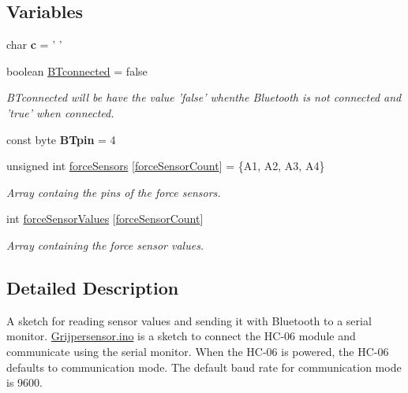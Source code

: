 \subsection*{Variables}
\begin{DoxyCompactItemize}
\item 
\hypertarget{_grijpersensor_8ino_adc08ed1554f35803d229aeaf11216b3f}{char {\bfseries c} = ' '}\label{_grijpersensor_8ino_adc08ed1554f35803d229aeaf11216b3f}

\item 
\hypertarget{_grijpersensor_8ino_aaa90a429df8bee3b9a5abc2d461504c7}{boolean \hyperlink{_grijpersensor_8ino_aaa90a429df8bee3b9a5abc2d461504c7}{B\-Tconnected} = false}\label{_grijpersensor_8ino_aaa90a429df8bee3b9a5abc2d461504c7}

\begin{DoxyCompactList}\small\item\em B\-Tconnected will be have the value 'false' whenthe Bluetooth is not connected and 'true' when connected. \end{DoxyCompactList}\item 
\hypertarget{_grijpersensor_8ino_a5b25b10ec39285cd67d590282c885137}{const byte {\bfseries B\-Tpin} = 4}\label{_grijpersensor_8ino_a5b25b10ec39285cd67d590282c885137}

\item 
unsigned int \hyperlink{_grijpersensor_8ino_a6099e7bd1f83195ab2a72d7f11b27747}{force\-Sensors} \mbox{[}\hyperlink{_grijpersensor_8ino_af1d722b858b750ddb4d06b4e2eae635b}{force\-Sensor\-Count}\mbox{]} = \{A1, A2, A3, A4\}
\begin{DoxyCompactList}\small\item\em Array containg the pins of the force sensors. \end{DoxyCompactList}\item 
int \hyperlink{_grijpersensor_8ino_add646649e927be589ada2150d1c32051}{force\-Sensor\-Values} \mbox{[}\hyperlink{_grijpersensor_8ino_af1d722b858b750ddb4d06b4e2eae635b}{force\-Sensor\-Count}\mbox{]}
\begin{DoxyCompactList}\small\item\em Array containing the force sensor values. \end{DoxyCompactList}\end{DoxyCompactItemize}


\subsection{Detailed Description}
A sketch for reading sensor values and sending it with Bluetooth to a serial monitor. \hyperlink{_grijpersensor_8ino}{Grijpersensor.\-ino} is a sketch to connect the H\-C-\/06 module and communicate using the serial monitor. When the H\-C-\/06 is powered, the H\-C-\/06 defaults to communication mode. The default baud rate for communication mode is 9600. 

